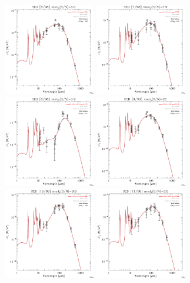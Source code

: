 \documentclass[preprint2,longabstract]{aastex}
\begin{document}
\begin{figure}
	\includegraphics[trim=0 2mm 0 0, clip, width=40mm]{../SEDs/sed_06.pdf}
    \includegraphics[trim=0 2mm 0 0, clip, width=40mm]{../SEDs/sed_07.pdf}
	\includegraphics[trim=0 2mm 0 0, clip, width=40mm]{../SEDs/sed_08.pdf}
	\includegraphics[trim=0 2mm 0 0, clip, width=40mm]{../SEDs/sed_09.pdf}
	\includegraphics[trim=0 2mm 0 0, clip, width=40mm]{../SEDs/sed_10.pdf}
	\includegraphics[trim=0 2mm 0 0, clip, width=40mm]{../SEDs/sed_11.pdf}

\end{figure}
\end{document}
